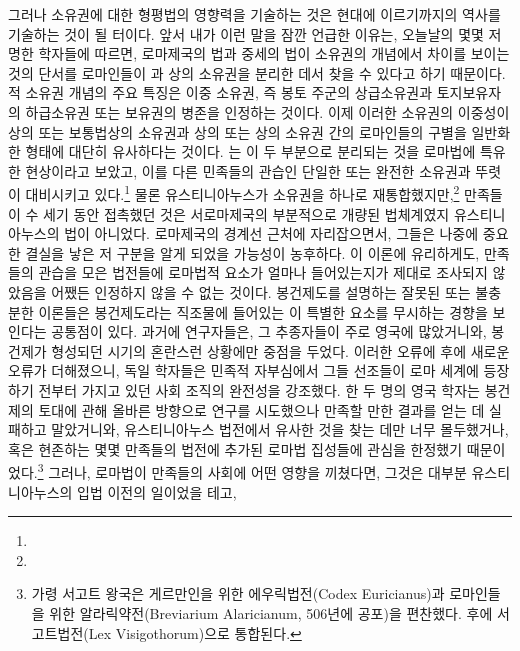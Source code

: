 그러나 소유권에 대한 형평법의 영향력을 기술하는 것은
현대에 이르기까지의 역사를 기술하는 것이 될 터이다.
앞서 내가 이런 말을 잠깐 언급한 이유는,
오늘날의 몇몇 저명한 학자들에 따르면,
로마제국의 법과 중세의 법이 소유권의 개념에서 차이를 보이는 것의 단서를
로마인들이 과 상의 소유권을 분리한 데서
찾을 수 있다고 하기 때문이다.
적 소유권 개념의 주요 특징은
이중 소유권,
즉 봉토 주군의 상급소유권과
토지보유자의 하급소유권 또는 보유권의
병존을 인정하는 것이다.
이제 이러한 소유권의 이중성이
상의 또는 보통법상의 소유권과
%
상의 또는 상의 소유권 간의
로마인들의
구별을
일반화한 형태에 대단히 유사하다는 것이다.
는
이 두 부분으로 분리되는 것을
로마법에 특유한 현상이라고 보았고,
이를 다른 민족들의 관습인
단일한 또는 완전한 소유권과 뚜렷이
대비시키고 있다.\footnote{%
   }
물론
유스티니아누스가 소유권을
하나로 재통합했지만,\footnote{%
  }
만족들이 수 세기 동안 접촉했던 것은
서로마제국의 부분적으로 개량된 법체계였지
유스티니아누스의 법이 아니었다.
로마제국의 경계선 근처에 자리잡으면서,
그들은
나중에 중요한 결실을 낳은
저 구분을 알게 되었을 가능성이 농후하다.
이 이론에 유리하게도,
만족들의 관습을 모은 법전들에
로마법적 요소가 얼마나 들어있는지가
제대로 조사되지 않았음을
어쨌든 인정하지 않을 수 없는 것이다.
봉건제도를 설명하는 잘못된 또는 불충분한 이론들은
봉건제도라는 직조물에 들어있는
이 특별한 요소를 무시하는 경향을 보인다는 공통점이 있다.
과거에 연구자들은,
그 추종자들이 주로 영국에 많았거니와,
봉건제가 형성되던 시기의 혼란스런 상황에만 중점을 두었다.
이러한 오류에 후에 새로운 오류가 더해졌으니,
독일 학자들은
민족적 자부심에서
그들 선조들이 로마 세계에 등장하기 전부터
가지고 있던 사회 조직의 완전성을 강조했다.
한 두 명의 영국 학자는
봉건제의 토대에 관해
올바른 방향으로 연구를
시도했으나
만족할 만한 결과를 얻는 데 실패하고 말았거니와,
유스티니아누스 법전에서 유사한 것을 찾는 데만 너무 몰두했거나,
혹은 현존하는 몇몇 만족들의 법전에 추가된
로마법 집성들에 관심을 한정했기 때문이었다.\footnote{%
  가령 서고트 왕국은 게르만인을 위한 에우릭법전(Codex Euricianus)과
  로마인들을 위한 알라릭약전(Breviarium Alaricianum, 506년에 공포)을 편찬했다.
  후에 서고트법전(Lex Visigothorum)으로 통합된다. }
그러나,
로마법이 만족들의 사회에 어떤 영향을 끼쳤다면,
그것은
대부분
유스티니아누스의 입법 이전의 일이었을 테고,
